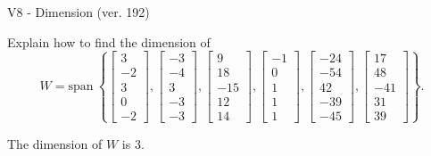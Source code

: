 \begin{exercise}
  \begin{exerciseTitle}V8 - Dimension (ver. 192)\end{exerciseTitle}
  \begin{exerciseStatement}
    Explain how to find the dimension of 
\[W=\mathrm{span}\ \left\{\left[\begin{array}{r}
3 \\
-2 \\
3 \\
0 \\
-2
\end{array}\right] , \left[\begin{array}{r}
-3 \\
-4 \\
3 \\
-3 \\
-3
\end{array}\right] , \left[\begin{array}{r}
9 \\
18 \\
-15 \\
12 \\
14
\end{array}\right] , \left[\begin{array}{r}
-1 \\
0 \\
1 \\
1 \\
1
\end{array}\right] , \left[\begin{array}{r}
-24 \\
-54 \\
42 \\
-39 \\
-45
\end{array}\right] , \left[\begin{array}{r}
17 \\
48 \\
-41 \\
31 \\
39
\end{array}\right]\right\}.\]



  \end{exerciseStatement}
  \begin{exerciseAnswer}
   The dimension of \(W\) is  \(3\).
  


  \end{exerciseAnswer}
\end{exercise}